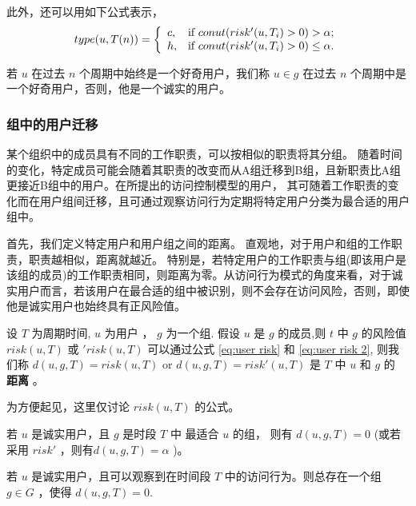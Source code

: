 此外，还可以用如下公式表示，
\begin{equation}\label{eq:user type Tn 2}
type(u,T(n))=
\left\{
\begin{array}{ll}
c, & \hbox{if $conut(risk'(u,T_i) > 0) > \alpha$;} \\
h, & \hbox{if $conut(risk'(u,T_i) > 0) \leq \alpha$.} \\
\end{array}
\right.
\end{equation}

若 $u$ 在过去 $n$ 个周期中始终是一个好奇用户，我们称 $u \in g$ 在过去 $n$ 个周期中是一个好奇用户，否则，他是一个诚实的用户。

\subsubsection{组中的用户迁移}
某个组织中的成员具有不同的工作职责，可以按相似的职责将其分组。 随着时间的变化，特定成员可能会随着其职责的改变而从A组迁移到B组，且新职责比A组更接近B组中的用户。在所提出的访问控制模型的用户， 其可随着工作职责的变化而在用户组间迁移，且可通过观察访问行为定期将特定用户分类为最合适的用户组中。

首先，我们定义特定用户和用户组之间的距离。 直观地，对于用户和组的工作职责，职责越相似，距离就越近。 特别是，若特定用户的工作职责与组(即该用户是该组的成员)的工作职责相同，则距离为零。从访问行为模式的角度来看，对于诚实用户而言，若该用户在最合适的组中被识别，则不会存在访问风险，否则，即使他是诚实用户也始终具有正风险值。

\begin{definition}%
	\label{user-group distance}
	设 $T$ 为周期时间, $u$ 为用户 ， $g$ 为一个组. 假设 $u$ 是 $g$ 的成员,则 $t$ 中 $g$ 的风险值 $risk(u,T)$ 或 $'risk(u,T)$ 可以通过公式 \ref{eq:user risk} 和 \ref{eq:user risk 2}, 则我们称 $d(u,g,T)=risk(u,T)$ or $d(u,g,T)=risk'(u,T)$ 是 $T$ 中 $u$ 和 $g$ 的 \textbf{距离} 。
\end{definition}

为方便起见，这里仅讨论 $risk(u,T)$ 的公式。

\begin{claim}[用户组距离]
	若 $u$ 是诚实用户，且 $g$ 是时段 $T$ 中 最适合 $u$ 的组， 则有 $d(u,g,T)=0$ (或若采用 $risk'$ ，则有$d(u,g,T)=\alpha$ )。
\end{claim}

\begin{claim}
	若 $u$ 是诚实用户，且可以观察到在时间段 $T$ 中的访问行为。则总存在一个组 $g \in G$ ，使得 $d(u,g,T)=0$.
\end{claim}

